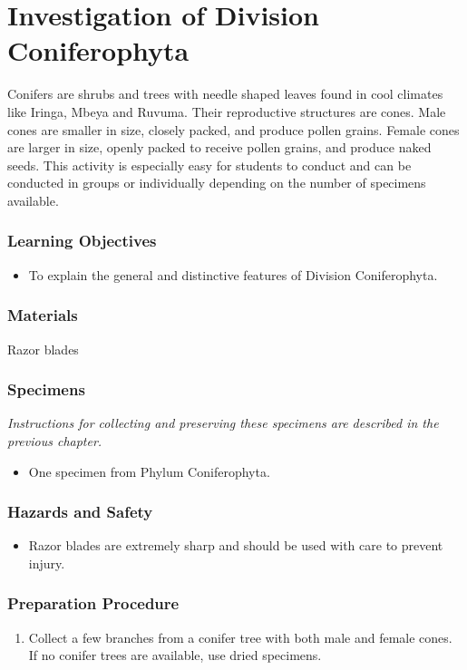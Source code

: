 \section{Investigation of Division Coniferophyta}
Conifers are shrubs and trees with needle shaped leaves found in cool climates like Iringa, Mbeya and Ruvuma. Their reproductive structures are cones. Male cones are smaller in size, closely packed, and produce pollen grains. Female cones are larger in size, openly packed to receive pollen grains, and produce naked seeds. This activity is especially easy for students to conduct and can be conducted in groups or individually depending on the number of specimens available.

\subsubsection*{Learning Objectives}
\begin{itemize}
\item{To explain the general and distinctive features of Division Coniferophyta.}
\end{itemize}

\subsubsection*{Materials}
Razor blades

\subsubsection*{Specimens}
\textit{Instructions for collecting and preserving these specimens are described in the previous chapter.}
\begin{itemize}
\item{One specimen from Phylum Coniferophyta.}
\end{itemize}

\subsubsection*{Hazards and Safety}
\begin{itemize}
\item{Razor blades are extremely sharp and should be used with care to prevent injury.}
\end{itemize}

\subsubsection*{Preparation Procedure}
\begin{enumerate}
\item{Collect a few branches from a conifer tree with both male and female cones. If no conifer trees are available, use dried specimens.}
\end{enumerate}

